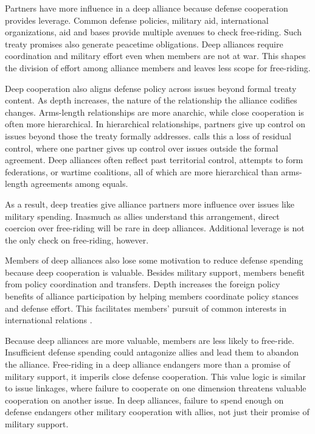 \documentclass[12pt]{article}
\begin{document}
Partners have more influence in a deep alliance because defense cooperation provides leverage. 
Common defense policies, military aid, international organizations, aid and bases provide multiple avenues to check free-riding. 
Such treaty promises also generate peacetime obligations. 
Deep alliances require coordination and military effort even when members are not at war. 
This shapes the division of effort among alliance members and leaves less scope for free-riding. 



Deep cooperation also aligns defense policy across issues beyond formal treaty content. 
As depth increases, the nature of the relationship the alliance codifies changes. 
Arms-length relationships are more anarchic, while close cooperation is often more hierarchical. 
In hierarchical relationships, partners give up control on issues beyond those the treaty formally addresses. 
\citet{Lake1996} calls this a loss of residual control, where one partner gives up control over issues outside the formal agreement. 
Deep alliances often reflect past territorial control, attempts to form federations, or wartime coalitions, all of which are more hierarchical than arms-length agreements among equals. 


As a result, deep treaties give alliance partners more influence over issues like military spending.
Inasmuch as allies understand this arrangement, direct coercion over free-riding will be rare in deep alliances.  
Additional leverage is not the only check on free-riding, however. 


Members of deep alliances also lose some motivation to reduce defense spending because deep cooperation is valuable. 
Besides military support, members benefit from policy coordination and transfers. 
Depth increases the foreign policy benefits of alliance participation by helping members coordinate policy stances and defense effort.
This facilitates members' pursuit of common interests in international relations \citep{Snyder1997}. 


Because deep alliances are more valuable, members are less likely to free-ride. 
Insufficient defense spending could antagonize allies and lead them to abandon the alliance. 
Free-riding in a deep alliance endangers more than a promise of military support, it imperils close defense cooperation. 
This value logic is similar to issue linkages, where failure to cooperate on one dimension threatens valuable cooperation on another issue. 
In deep alliances, failure to spend enough on defense endangers other military cooperation with allies, not just their promise of military support. 
\end{document}
